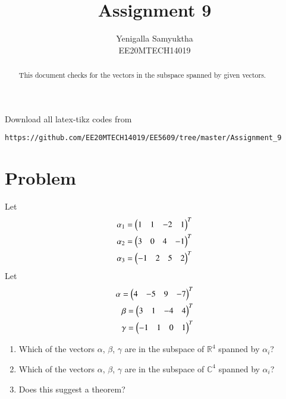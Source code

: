 \documentclass[journal,12pt,twocolumn]{IEEEtran}
\begin{document}
     \def\rightbox#1{\makebox[0in][r]{#1}}
     \def\centbox#1{\makebox[0in]{#1}}
     \def\topbox#1{\raisebox{-\baselineskip}[0in][0in]{#1}}
     \def\midbox#1{\raisebox{-0.5\baselineskip}[0in][0in]{#1}}
\vspace{3cm}
\title{Assignment 9}
\author{Yenigalla Samyuktha\\EE20MTECH14019}
\maketitle
\newpage
\bigskip
\renewcommand{\thefigure}{\theenumi}
\renewcommand{\thetable}{\theenumi}
\begin{abstract}
This document checks for the vectors in the subspace spanned by given vectors.
\end{abstract}
Download all latex-tikz codes from 
%
\begin{lstlisting}
https://github.com/EE20MTECH14019/EE5609/tree/master/Assignment_9
\end{lstlisting}
%
\section{Problem}
Let
\begin{align} 
\alpha_1=\begin{pmatrix}1&1&-2&1\end{pmatrix}^T \\
\alpha_2=\begin{pmatrix}3&0&4&-1\end{pmatrix}^T \\
\alpha_3=\begin{pmatrix}-1&2&5&2\end{pmatrix}^T
\end{align}
Let
\begin{align}
\alpha=\begin{pmatrix}4&-5&9&-7\end{pmatrix}^T \\
\beta=\begin{pmatrix}3&1&-4&4\end{pmatrix}^T \\
\gamma=\begin{pmatrix}-1&1&0&1\end{pmatrix}^T
\end{align}
\begin{enumerate}
\item Which of the vectors $\alpha$, $\beta$, $\gamma$ are in the subspace of $\mathbb{R}^4$ spanned by $\alpha_i$?
\item Which of the vectors $\alpha$, $\beta$, $\gamma$ are in the subspace of $\mathbb{C}^4$ spanned by $\alpha_i$?
\item Does this suggest a theorem?
\end{enumerate}
\end{document}
